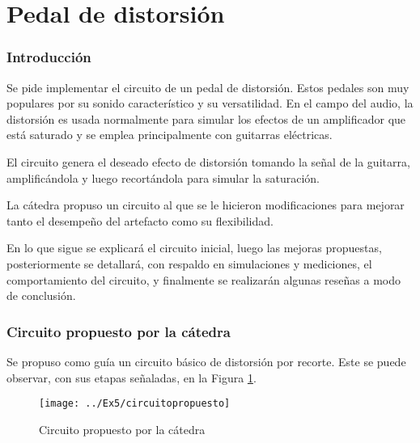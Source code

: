 
\part{Pedal de distorsión}

\section{Introducción}
Se pide implementar el circuito de un pedal de distorsión. Estos pedales son muy populares por su sonido característico y su versatilidad. En el campo del audio, la distorsión es usada normalmente para simular los efectos
de un amplificador que está saturado y se emplea principalmente con guitarras eléctricas.

El circuito genera el deseado efecto de distorsión tomando la señal de la guitarra, amplificándola y luego recortándola para simular la saturación.

La cátedra propuso un circuito al que se le hicieron modificaciones para mejorar tanto el desempeño del artefacto como su flexibilidad.

En lo que sigue se explicará el circuito inicial, luego las mejoras propuestas, posteriormente se detallará, con respaldo en simulaciones y mediciones, el comportamiento del circuito, y finalmente se realizarán algunas reseñas a modo de conclusión.

\section{Circuito propuesto por la cátedra}
Se propuso como guía un circuito básico de distorsión por recorte. Este se puede observar, con sus etapas señaladas, en la Figura \ref{fig:circuitopropuesto}.

\begin{figure}[h]
    \centering
    \texttt{[image: ../Ex5/circuitopropuesto]}
    \caption{Circuito propuesto por la cátedra}
    \label{fig:circuitopropuesto}
\end{figure}
